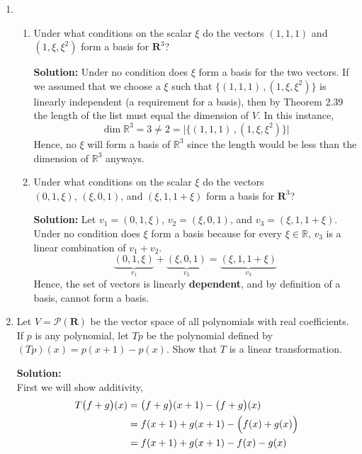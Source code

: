 \documentclass[12pt]{article}
\newcommand{\R}{\mathbb{R}}
\newcommand{\T}[2]{T\big({#1}\big)({#2})}
\newcommand{\func}[2]{\big({#1}\big)({#2})}
\begin{document}
\begin{enumerate}
\newpage
\item
    \begin{enumerate}
        \item Under what conditions on the scalar $\xi$ do the vectors $(1,1,1)$ and $(1, \xi , \xi^2 )$ form a basis for $\mathbf{R}^3$?
        \begin{mybox}
            \textbf{Solution:} Under no condition does $\xi$ form a basis for the two vectors. If we assumed that we choose a $\xi$ such that $\{(1,1,1)\,, (1,\xi, \xi^2)\}$ is linearly independent (a requirement for a basis), then by Theorem 2.39 the length of the list must equal the dimension of $V$. In this instance, $$\operatorname{dim}\R^3 = 3 \neq 2 = \big|\{(1,1,1)\,, (1,\xi, \xi^2)\}\big|$$ Hence, no $\xi$ will form a basis of $\R^3$ since the length would be less than the dimension of $\R^3$ anyways.
        \end{mybox}
        \vspace{2in}
        \item Under what conditions on the scalar $\xi$ do the vectors\\ $(0,1,\xi)$, $(\xi , 0,1 )$, and $(\xi,1,1+\xi)$  form a basis for $\mathbf{R}^3$?
        \begin{mybox}
            \textbf{Solution:} Let $v_1 = (0,1,\xi)$, $v_2 = (\xi , 0,1 )$, and $v_3 = (\xi,1,1+\xi)$. Under no condition does $\xi$ form a basis because for every $\xi \in \R$, $v_3$ is a linear combination of $v_1 + v_2$. 
            $$\underbrace{(0,1,\xi)}_{v_1} + \underbrace{(\xi,0,1)}_{v_2} = \underbrace{(\xi, 1, 1 + \xi)}_{v_3}$$
            Hence, the set of vectors is linearly \textbf{dependent}, and by definition of a basis, cannot form a basis.
        \end{mybox}
    \end{enumerate}
\newpage
\item Let $V = \mathcal{P}(\mathbf{R})$ be the vector space of all polynomials with real coefficients.  If $p$ is any polynomial, let $Tp$ be the polynomial defined by $(Tp)(x) = p(x+1) - p(x)$.  Show that $T$ is a linear transformation.
\begin{mybox}
    \textbf{Solution: } \\First we will show additivity,
    \begin{align}
        \T{f+g}{x} &= \func{f+g}{x+1} - \func{f+g}{x} \notag\\
        &= f(x+1) + g(x+1) - \Big(f(x) + g(x) \Big)\notag\\
        &= f(x+1) + g(x+1) - f(x) - g(x) \notag\\

\end{align}
\end{mybox}
\end{enumerate}
\end{document}
